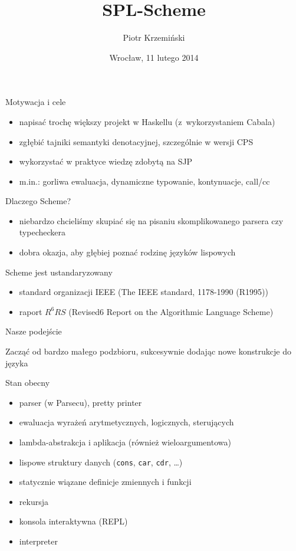 \documentclass[12pt,serif]{beamer}
\title{SPL-Scheme}
\author{Piotr Krzemiński}
\date{Wrocław, 11 lutego 2014}
\begin{document}
\begin{frame}
\titlepage
\end{frame}


\begin{frame}{Motywacja i cele}
\begin{itemize}
  \item napisać trochę większy projekt w Haskellu (z~wykorzystaniem Cabala)
  \item zgłębić tajniki semantyki denotacyjnej, szczególnie w wersji CPS
  \item wykorzystać w praktyce wiedzę zdobytą na SJP
  \item m.in.: gorliwa ewaluacja, dynamiczne typowanie, kontynuacje, call/cc
\end{itemize}
\end{frame}

\begin{frame}{Dlaczego Scheme?}
\begin{itemize}
  \item niebardzo chcieliśmy skupiać się na pisaniu skomplikowanego
        parsera czy typecheckera
  \item dobra okazja, aby głębiej poznać rodzinę języków lispowych
\end{itemize}
\end{frame}

\begin{frame}{Scheme jest ustandaryzowany}
\begin{itemize}
  \item standard organizacji IEEE (The IEEE standard, 1178-1990 (R1995))
  \item raport $R^6RS$ (Revised6 Report on the Algorithmic Language Scheme)
\end{itemize}
\end{frame}

\begin{frame}{Nasze podejście}
\begin{center}
Zacząć od bardzo małego podzbioru, sukcesywnie dodając
nowe konstrukcje do języka
\end{center}
\end{frame}

\begin{frame}{Stan obecny}
\begin{itemize}
  \item parser (w Parsecu), pretty printer
  \item ewaluacja wyrażeń arytmetycznych, logicznych, sterujących
  \item lambda-abstrakcja i aplikacja (również wieloargumentowa)
  \item lispowe struktury danych (\texttt{cons}, \texttt{car}, \texttt{cdr}, \ldots)
  \item statycznie wiązane definicje zmiennych i funkcji
  \item rekursja
  \item konsola interaktywna (REPL)
  \item interpreter
\end{itemize}
\end{frame}
\end{document}
